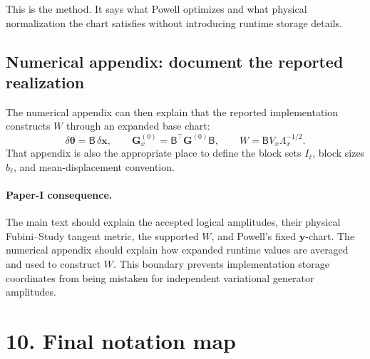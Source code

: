 \documentclass[11pt]{article}
\newcommand{\paperone}{\paragraph{Paper-I consequence.}}
\begin{document}
This is the method.  It says what Powell optimizes and what physical
normalization the chart satisfies without introducing runtime storage
details.

\subsection*{Numerical appendix: document the reported realization}

The numerical appendix can then explain that the reported implementation
constructs \(W\) through an expanded base chart:
\begin{equation}
\delta\boldsymbol\theta=\mathsf B\,\delta\mathbf x,
\qquad
\mathbf G_x^{(0)}
=\mathsf B^\top\mathbf G^{(0)}\mathsf B,
\qquad
W=\mathsf B V_x\Lambda_x^{-1/2}.
\label{eq:appendix-realization}
\end{equation}
That appendix is also the appropriate place to define the block sets
\(I_\ell\), block sizes \(b_\ell\), and mean-displacement convention.

\paperone The main text should explain the accepted logical amplitudes, their
physical Fubini--Study tangent metric, the supported \(W\), and Powell's fixed
\(\mathbf y\)-chart.  The numerical appendix should explain how expanded
runtime values are averaged and used to construct \(W\).  This boundary
prevents implementation storage coordinates from being mistaken for
independent variational generator amplitudes.

\section*{10. Final notation map}
\end{document}
